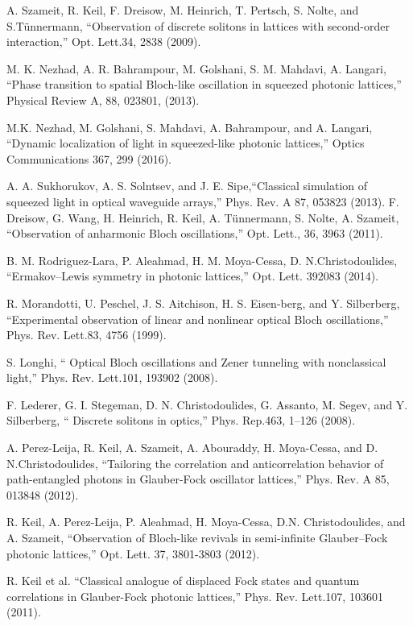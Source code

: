 \documentclass[12pt]{article}
\numberwithin{equation}{section}
\begin{document}
\begin{thebibliography}{unsrt}
 A. Szameit, R. Keil, F. Dreisow, M. Heinrich, T. Pertsch, S. Nolte, and S.Tünnermann, “Observation of discrete solitons in lattices with second-order interaction,” Opt. Lett.34, 2838 (2009).

 M. K. Nezhad, A. R. Bahrampour, M. Golshani, S. M. Mahdavi, A. Langari, “Phase transition to spatial Bloch-like oscillation in squeezed photonic lattices,” Physical Review A, 88, 023801, (2013).

 M.K. Nezhad, M. Golshani, S. Mahdavi, A. Bahrampour, and A. Langari, “Dynamic localization of light in squeezed-like photonic lattices,” Optics Communications 367, 299 (2016). 

 A. A. Sukhorukov, A. S. Solntsev, and J. E. Sipe,“Classical simulation of squeezed light in optical waveguide arrays,” Phys. Rev. A 87, 053823 (2013).
 F. Dreisow, G. Wang,   H. Heinrich, R.  Keil, A.  Tünnermann, S. Nolte, A. Szameit, “Observation of anharmonic Bloch oscillations,”  Opt. Lett.,  36, 3963 (2011).

 B. M. Rodriguez-Lara, P. Aleahmad, H. M. Moya-Cessa, D. N.Christodoulides, “Ermakov–Lewis symmetry in photonic lattices,” Opt. Lett. 392083 (2014).

 R. Morandotti, U. Peschel, J. S. Aitchison, H. S. Eisen-berg, and Y. Silberberg, “Experimental observation of linear and nonlinear optical Bloch oscillations,” Phys. Rev. Lett.83, 4756 (1999).

 S. Longhi, “ Optical Bloch oscillations and Zener tunneling with nonclassical light,” Phys. Rev. Lett.101, 193902 (2008).

  F. Lederer, G. I. Stegeman, D. N. Christodoulides, G. Assanto, M. Segev, and Y. Silberberg, “ Discrete solitons in optics,” Phys. Rep.463, 1–126 (2008).

 A. Perez-Leija, R. Keil, A. Szameit, A. Abouraddy, H. Moya-Cessa, and D. N.Christodoulides, “Tailoring the correlation and anticorrelation behavior of path-entangled photons in Glauber-Fock oscillator lattices,” Phys. Rev. A 85, 013848 (2012).

 R. Keil, A. Perez-Leija, P. Aleahmad, H. Moya-Cessa, D.N. Christodoulides, and A. Szameit, “Observation of Bloch-like revivals in semi-infinite Glauber–Fock photonic lattices,” Opt. Lett. 37, 3801-3803 (2012).

 R. Keil et al. “Classical analogue of displaced Fock states and quantum correlations in Glauber-Fock photonic lattices,” Phys. Rev. Lett.107, 103601 (2011).


\end{thebibliography}
\end{document}
